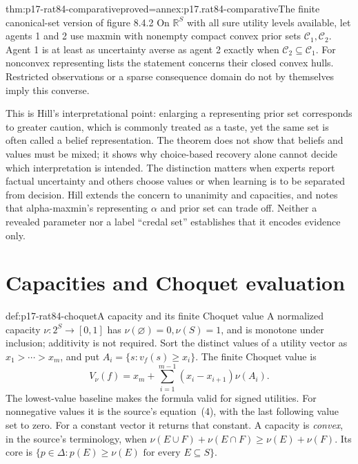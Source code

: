 \begin{hbtheorem}{thm:p17-rat84-comparative}{proved=annex:p17.rat84-comparative}{The finite canonical-set version of figure 8.4.2}
On \(\mathbb R^S\) with all sure utility levels available, let
agents 1 and 2 use maxmin with nonempty compact convex prior sets
\(\mathcal C_1,\mathcal C_2\). Agent 1 is at least as uncertainty
averse as agent 2 exactly when
\(\mathcal C_2\subseteq\mathcal C_1\).
For nonconvex representing lists the statement concerns their closed
convex hulls. Restricted observations or a sparse consequence domain
do not by themselves imply this converse.
\end{hbtheorem}

This is Hill's interpretational point: enlarging a representing prior
set corresponds to greater caution, which is commonly treated as a taste,
yet the same set is often called a belief representation. The theorem
does not show that beliefs and values must be mixed; it shows why
choice-based recovery alone cannot decide which interpretation is intended.
The distinction matters when experts report factual uncertainty and
others choose values or when learning is to be separated from decision.
Hill extends the concern to unanimity and capacities, and notes that
alpha-maxmin's representing \(\alpha\) and prior set can trade off.
Neither a revealed parameter nor a label ``credal set'' establishes
that it encodes evidence only.
\cite[Secs.~2.2--2.3 and note~9, pp.~498--500, 503]{Hill2021DecisionUncertainty}

\section{Capacities and Choquet evaluation}
\label{sec:p17-rat84-capacity}

\begin{hbdefinition}{def:p17-rat84-choquet}{A capacity and its finite Choquet value}
A normalized capacity \(\nu:2^S\to[0,1]\) has
\(\nu(\varnothing)=0,\nu(S)=1\), and is monotone under inclusion;
additivity is not required. Sort the distinct values of a utility
vector as \(x_1>\cdots>x_m\), and put
\(A_i=\{s:v_f(s)\geq x_i\}\). The finite Choquet value is
\[
        V_\nu(f)=x_m+\sum_{i=1}^{m-1}(x_i-x_{i+1})\nu(A_i).
\]
The lowest-value baseline makes the formula valid for signed utilities.
For nonnegative values it is the source's equation~(4), with the
last following value set to zero. For a constant vector it returns
that constant.
A capacity is \emph{convex}, in the source's terminology, when
\(\nu(E\cup F)+\nu(E\cap F)\geq\nu(E)+\nu(F)\).
Its core is
\(\{p\in\Delta:p(E)\geq\nu(E)\text{ for every }E\subseteq S\}\).
\end{hbdefinition}

